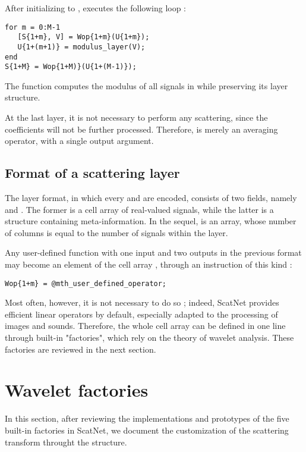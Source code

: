 \documentclass{article}
\begin{document}
After initializing  to ,  executes the following loop :

\begin{lstlisting}
for m = 0:M-1
   [S{1+m}, V] = Wop{1+m}(U{1+m});
   U{1+(m+1)} = modulus_layer(V);
end
S{1+M} = Wop{1+M)}(U{1+(M-1)});
\end{lstlisting}

The function  computes the modulus of all signals in  while preserving its layer structure.

At the last layer, it is not necessary to perform any scattering, since the coefficients will not be further processed. Therefore,  is merely an averaging operator, with a single output argument.

\subsection{Format of a scattering layer}

The layer format, in which every  and  are encoded, consists of two fields, namely  and . The former is a cell array of real-valued signals, while the latter is a structure containing meta-information. In the sequel,  is an array, whose number of columns is equal to the number of signals within the layer.

Any user-defined function with one input and two outputs in the previous format may become an element of the cell array , through an instruction of this kind :

\begin{lstlisting}
Wop{1+m} = @mth_user_defined_operator;
\end{lstlisting}

Most often, however, it is not necessary to do so ; indeed, ScatNet provides efficient linear operators by default, especially adapted to the processing of images and sounds. Therefore, the whole cell array  can be defined in one line through built-in "factories", which rely on the theory of wavelet analysis. These factories are reviewed in the next section.


\section{Wavelet factories \label{sec:wavelet-factories}}
In this section, after reviewing the implementations and prototypes of the five built-in factories in ScatNet, we document the customization of the scattering transform throught the  structure.
\end{document}
